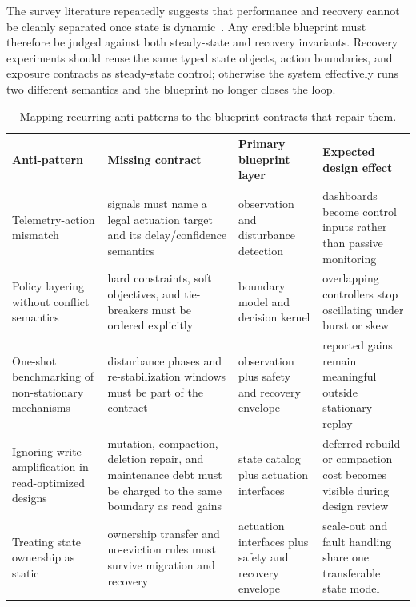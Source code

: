 \documentclass[acmsmall,screen,review]{acmart}
\begin{document}
The survey literature repeatedly suggests that performance and recovery cannot be cleanly separated once state is dynamic~\cite{chandy1985snapshot,schneider1990state,zhao2024recovery}. Any credible blueprint must therefore be judged against both steady-state and recovery invariants. Recovery experiments should reuse the same typed state objects, action boundaries, and exposure contracts as steady-state control; otherwise the system effectively runs two different semantics and the blueprint no longer closes the loop.

\begin{table}[t]
\small
\caption{Mapping recurring anti-patterns to the blueprint contracts that repair them.}
\label{tab:antipattern-blueprint}
\begin{tabularx}{\textwidth}{>{\raggedright\arraybackslash}p{}>{\raggedright\arraybackslash}p{}>{\raggedright\arraybackslash}p{}>{\raggedright\arraybackslash}Y}
\toprule
Anti-pattern & Missing contract & Primary blueprint layer & Expected design effect \\
\midrule
Telemetry-action mismatch & signals must name a legal actuation target and its delay/confidence semantics & observation and disturbance detection & dashboards become control inputs rather than passive monitoring \\
Policy layering without conflict semantics & hard constraints, soft objectives, and tie-breakers must be ordered explicitly & boundary model and decision kernel & overlapping controllers stop oscillating under burst or skew \\
One-shot benchmarking of non-stationary mechanisms & disturbance phases and re-stabilization windows must be part of the contract & observation plus safety and recovery envelope & reported gains remain meaningful outside stationary replay \\
Ignoring write amplification in read-optimized designs & mutation, compaction, deletion repair, and maintenance debt must be charged to the same boundary as read gains & state catalog plus actuation interfaces & deferred rebuild or compaction cost becomes visible during design review \\
Treating state ownership as static & ownership transfer and no-eviction rules must survive migration and recovery & actuation interfaces plus safety and recovery envelope & scale-out and fault handling share one transferable state model \\
\bottomrule
\end{tabularx}
\end{table}
\end{document}
